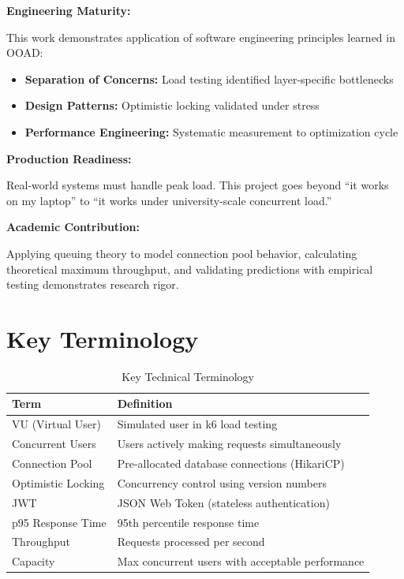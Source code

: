 \documentclass[12pt,a4paper,oneside]{report}
\begin{document}
\textbf{Engineering Maturity:}

This work demonstrates application of software engineering principles learned in OOAD:
\begin{itemize}[leftmargin=1.5em,topsep=0.3em,itemsep=0.2em]
    \item \textbf{Separation of Concerns:} Load testing identified layer-specific bottlenecks
    \item \textbf{Design Patterns:} Optimistic locking validated under stress
    \item \textbf{Performance Engineering:} Systematic measurement to optimization cycle
\end{itemize}

\textbf{Production Readiness:}

Real-world systems must handle peak load. This project goes beyond ``it works on my laptop'' to ``it works under university-scale concurrent load.''

\textbf{Academic Contribution:}

Applying queuing theory to model connection pool behavior, calculating theoretical maximum throughput, and validating predictions with empirical testing demonstrates research rigor.

\section{Key Terminology}

\begin{table}[H]
\centering
\small
\begin{tabular}{@{}ll@{}}
\toprule
\textbf{Term} & \textbf{Definition} \\
\midrule
VU (Virtual User) & Simulated user in k6 load testing \\
Concurrent Users & Users actively making requests simultaneously \\
Connection Pool & Pre-allocated database connections (HikariCP) \\
Optimistic Locking & Concurrency control using version numbers \\
JWT & JSON Web Token (stateless authentication) \\
p95 Response Time & 95th percentile response time \\
Throughput & Requests processed per second \\
Capacity & Max concurrent users with acceptable performance \\
\bottomrule
\end{tabular}
\caption{Key Technical Terminology}
\end{table}
\end{document}
